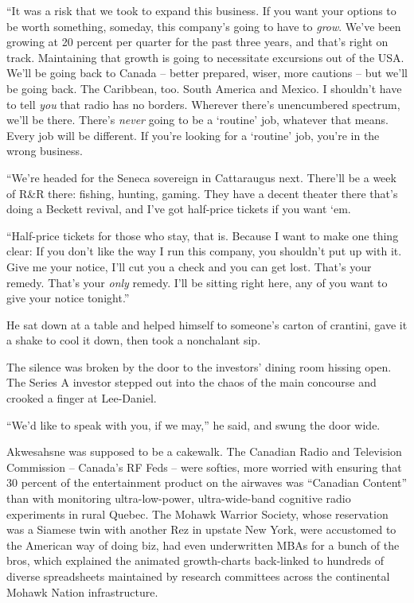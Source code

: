“It was a risk that we took to expand this business. If you want your 
options to be worth something, someday, this company's going to have to 
\emph{grow}. We've been growing at 20 percent per quarter for the past 
three years, and that's right on track. Maintaining that growth is 
going to necessitate excursions out of the USA. We'll be going back to 
Canada -- better prepared, wiser, more cautions -- but we'll be going 
back. The Caribbean, too. South America and Mexico. I shouldn't have to 
tell \emph{you} that radio has no borders. Wherever there's 
unencumbered spectrum, we'll be there. There's \emph{never} going to be 
a `routine' job, whatever that means. Every job will be different. If 
you're looking for a `routine' job, you're in the wrong business.

“We're headed for the Seneca sovereign in Cattaraugus next. There'll 
be a week of R{\&}R there: fishing, hunting, gaming. They have a decent 
theater there that's doing a Beckett revival, and I've got half-price 
tickets if you want `em.

“Half-price tickets for those who stay, that is. Because I want to 
make one thing clear: If you don't like the way I run this company, you 
shouldn't put up with it. Give me your notice, I'll cut you a check and 
you can get lost. That's your remedy. That's your \emph{only} remedy. 
I'll be sitting right here, any of you want to give your notice 
tonight.”

He sat down at a table and helped himself to someone's carton of 
crantini, gave it a shake to cool it down, then took a nonchalant sip.

The silence was broken by the door to the investors' dining room 
hissing open. The Series A investor stepped out into the chaos of the 
main concourse and crooked a finger at Lee-Daniel.

“We'd like to speak with you, if we may,” he said, and swung the 
door wide.

\tb

Akwesahsne was supposed to be a cakewalk. The Canadian Radio and 
Television Commission -- Canada's RF Feds -- were softies, more worried 
with ensuring that 30 percent of the entertainment product on the 
airwaves was “Canadian Content” than with monitoring 
ultra-low-power, ultra-wide-band cognitive radio experiments in rural 
Quebec. The Mohawk Warrior Society, whose reservation was a Siamese 
twin with another Rez in upstate New York, were accustomed to the 
American way of doing biz, had even underwritten MBAs for a bunch of 
the bros, which explained the animated growth-charts back-linked to 
hundreds of diverse spreadsheets maintained by research committees 
across the continental Mohawk Nation infrastructure.

